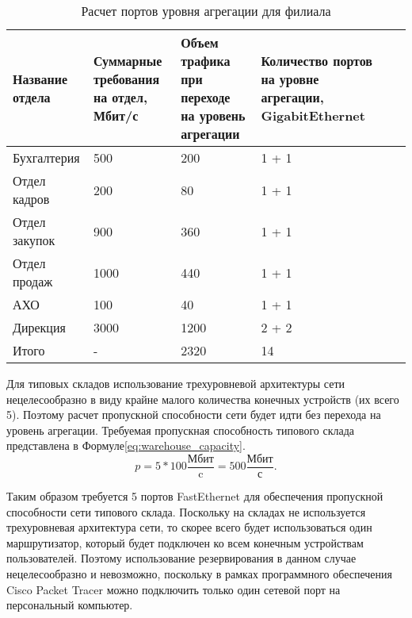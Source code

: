 \documentclass[14pt, a4paper]{extarticle}
\begin{document}
\begin{table}[H]
  \caption{Расчет портов уровня агрегации для филиала\label{tab:filial_agregation_ports}}
  \centering
  \small
  \begin{tabularx}{\textwidth}{|s|s|s|s|s|s|}
    \hline
    Название отдела & Суммарные требования на отдел, Мбит/с & Объем трафика при переходе на уровень агрегации & Количество портов на уровне агрегации, GigabitEthernet \\ \hline
    Бухгалтерия     & 500                                   & 200                                             & 1 + 1 \\ \hline
    Отдел кадров    & 200                                   & 80                                              & 1 + 1 \\ \hline
    Отдел закупок   & 900                                   & 360                                             & 1 + 1 \\ \hline
    Отдел продаж    & 1000                                  & 440                                             & 1 + 1 \\ \hline
    АХО             & 100                                   & 40                                              & 1 + 1 \\ \hline
    Дирекция        & 3000                                  & 1200                                            & 2 + 2 \\ \hline
    Итого           & -                                     & 2320                                            & 14 \\ \hline
  \end{tabularx}
\end{table}

Для типовых складов использование трехуровневой архитектуры сети
нецелесообразно в виду крайне малого количества конечных устройств (их
всего 5). Поэтому расчет пропускной способности сети будет идти без
перехода на уровень агрегации. Требуемая пропускная способность
типового склада представлена в Формуле\;\ref{eq:warehouse_capacity}.
\begin{equation}\label{eq:warehouse_capacity}
  p = 5 * 100 \frac{\text{Мбит}}{\text{c}} = 500 \frac{\text{Мбит}}{\text{с}}.
\end{equation}

Таким образом требуется 5 портов FastEthernet для обеспечения
пропускной способности сети типового склада. Поскольку на складах не
используется трехуровневая архитектура сети, то скорее всего будет
использоваться один маршрутизатор, который будет подключен ко всем
конечным устройствам пользователей. Поэтому использование
резервирования в данном случае нецелесообразно и невозможно, поскольку
в рамках программного обеспечения Cisco Packet Tracer можно подключить
только один сетевой порт на персональный компьютер.
\end{document}
